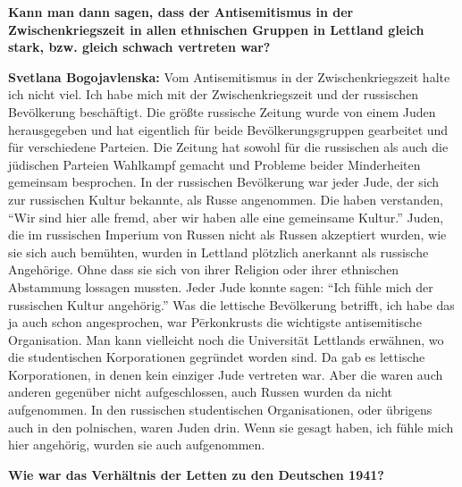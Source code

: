 \textbf{Kann man dann sagen, dass der Antisemitismus in der Zwischenkriegszeit in allen ethnischen Gruppen in Lettland gleich stark, bzw. gleich schwach vertreten war?}

\textbf{Svetlana Bogojavlenska:} Vom Antisemitismus in der Zwischenkriegszeit halte ich nicht viel. Ich habe mich mit der Zwischenkriegszeit und der russischen Bevölkerung beschäftigt. Die größte russische Zeitung wurde von einem Juden herausgegeben und hat eigentlich für beide Bevölkerungsgruppen gearbeitet und für verschiedene Parteien. Die Zeitung hat sowohl für die russischen als auch die jüdischen Parteien Wahlkampf gemacht und Probleme beider Minderheiten gemeinsam besprochen. In der russischen Bevölkerung war jeder Jude, der sich zur russischen Kultur bekannte, als Russe angenommen. Die haben verstanden, "`Wir sind hier alle fremd, aber wir haben alle eine gemeinsame Kultur."' Juden, die im russischen Imperium von Russen nicht als Russen akzeptiert wurden, wie sie sich auch bemühten, wurden in Lettland plötzlich anerkannt als russische Angehörige. Ohne dass sie sich von ihrer Religion oder ihrer ethnischen Abstammung lossagen mussten. Jeder Jude konnte sagen: "`Ich fühle mich der russischen Kultur angehörig."' Was die lettische Bevölkerung betrifft, ich habe das ja auch schon angesprochen, war Pērkonkrusts die wichtigste antisemitische Organisation. Man kann vielleicht noch die Universität Lettlands erwähnen, wo die studentischen Korporationen gegründet worden sind. Da gab es lettische Korporationen, in denen kein einziger Jude vertreten war. Aber die waren auch anderen gegenüber nicht aufgeschlossen, auch Russen wurden da nicht aufgenommen. In den russischen studentischen Organisationen, oder übrigens auch in den polnischen, waren Juden drin. Wenn sie gesagt haben, ich fühle mich hier angehörig, wurden sie auch aufgenommen. 

\textbf{Wie war das Verhältnis der Letten zu den Deutschen 1941?}

